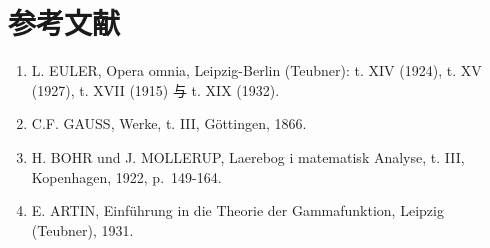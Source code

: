 \section*{参考文献}
{}

\begin{enumerate}
\def\labelenumi{(\Roman{enumi})}
\item
L. EULER, Opera omnia, Leipzig-Berlin (Teubner): t. XIV (1924), t. XV (1927), t. XVII (1915) 与 t. XIX (1932).
\item
  C.F. GAUSS, Werke, t. III, Göttingen, 1866.
\item
  H. BOHR und J. MOLLERUP, Laerebog i matematisk Analyse, t. III, Kopenhagen, 1922, p.~149-164.
\item
  E. ARTIN, Einführung in die Theorie der Gammafunktion, Leipzig (Teubner), 1931.
\end{enumerate}

\backmatter
